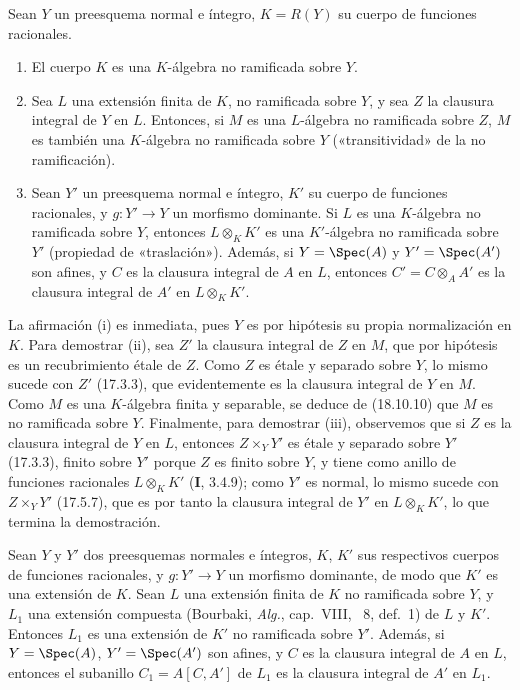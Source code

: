 \begin{proposition}[18.10.13]
\label{IV.18.10.13}
Sean $Y$ un preesquema normal e íntegro, $K=R(Y)$ su cuerpo de funciones racionales.
\begin{enumerate}
  \item[\textup{(i)}] El cuerpo $K$ es una $K$-álgebra no ramificada sobre $Y$.
  \item[\textup{(ii)}] Sea $L$ una extensión finita de $K$, no ramificada sobre $Y$, y sea $Z$ la clausura integral de $Y$ en $L$. Entonces, si $M$ es una $L$-álgebra no ramificada sobre $Z$, $M$ es también una $K$-álgebra no ramificada sobre $Y$ \textup{(«transitividad» de la no ramificación)}.
  \item[\textup{(iii)}] Sean $Y'$ un preesquema normal e íntegro, $K'$ su cuerpo de funciones racionales, y $g:Y'\to Y$ un morfismo dominante. Si $L$ es una $K$-álgebra no ramificada sobre $Y$, entonces $L\otimes_K K'$ es una $K'$-álgebra no ramificada sobre $Y'$ \textup{(propiedad de «traslación»)}. Además, si $Y=\Spec(A)$ y $Y'=\Spec(A')$ son afines, y $C$ es la clausura integral de $A$ en $L$, entonces $C'=C\otimes_A A'$ es la clausura integral de $A'$ en $L\otimes_K K'$.
\end{enumerate}
\end{proposition}

La afirmación (i) es inmediata, pues $Y$ es por hipótesis su propia normalización en $K$. Para demostrar (ii), sea $Z'$ la clausura integral de $Z$ en $M$, que por hipótesis es un recubrimiento étale de $Z$. Como $Z$ es étale y separado sobre $Y$, lo mismo sucede con $Z'$ (17.3.3), que evidentemente es la clausura integral de $Y$ en $M$. Como $M$ es una $K$-álgebra finita y separable, se deduce de (18.10.10) que $M$ es no ramificada sobre $Y$. Finalmente, para demostrar (iii), observemos que si $Z$ es la clausura integral de $Y$ en $L$, entonces $Z\times_Y Y'$ es étale y separado sobre $Y'$ (17.3.3), finito sobre $Y'$ porque $Z$ es finito sobre $Y$, y tiene como anillo de funciones racionales $L\otimes_K K'$ (\textbf I, 3.4.9); como $Y'$ es normal, lo mismo sucede con $Z\times_Y Y'$ (17.5.7), que es por tanto la clausura integral de $Y'$ en $L\otimes_K K'$, lo que termina la demostración.

\begin{corollary}[18.10.14]
\label{IV.18.10.14}
Sean $Y$ y $Y'$ dos preesquemas normales e íntegros, $K$, $K'$ sus respectivos cuerpos de funciones racionales, y $g:Y'\to Y$ un morfismo dominante, de modo que $K'$ es una extensión de $K$. Sean $L$ una extensión finita de $K$ no ramificada sobre $Y$, y $L_1$ una extensión compuesta \textup{(Bourbaki, \emph{Alg.}, cap.~VIII, \textsection~8, def.~1) de} $L$ y $K'$. Entonces $L_1$ es una extensión de $K'$ no ramificada sobre $Y'$. Además, si $Y=\Spec(A)$, $Y'=\Spec(A')$ son afines, y $C$ es la clausura integral de $A$ en $L$, entonces el subanillo $C_1=A[C,A']$ de $L_1$ es la clausura integral de $A'$ en $L_1$.
\end{corollary}

